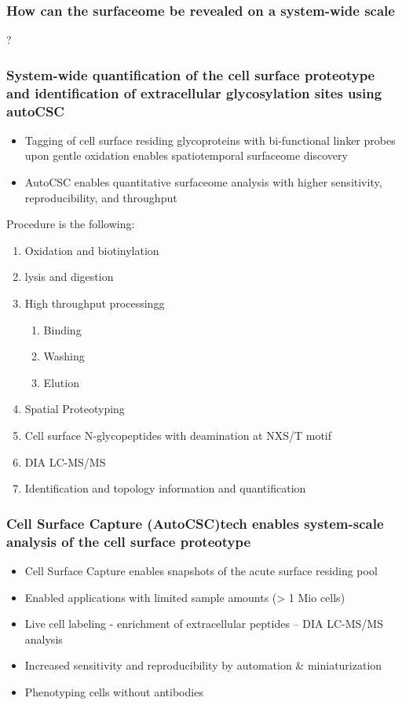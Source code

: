 \begin{itemize}
\begin{itemize}
\subsubsection{How can the surfaceome be revealed on a system-wide scale}?
\subsubsection{System-wide quantification of the cell surface proteotype and identification of extracellular glycosylation sites using autoCSC}
\begin{itemize}
    \item Tagging of cell surface residing glycoproteins with bi-functional linker probes upon gentle oxidation enables spatiotemporal surfaceome discovery
    \item AutoCSC enables quantitative surfaceome analysis with higher sensitivity, reproducibility, and throughput
\end{itemize}
Procedure is the following:
\begin{enumerate}
    \item Oxidation and biotinylation
    \item lysis and digestion
    \item High throughput processingg
    \begin{enumerate}
        \item Binding
        \item Washing
        \item Elution
    \end{enumerate}
    \item Spatial Proteotyping
    \item Cell surface N-glycopeptides with deamination at NXS/T motif
    \item DIA LC-MS/MS
    \item Identification and topology information and quantification
\end{enumerate}

\subsubsection{Cell Surface Capture (AutoCSC)tech enables system-scale analysis of the cell surface proteotype}
\begin{itemize}
    \item Cell Surface Capture enables snapshots of the
acute surface residing pool
\item Enabled applications with limited sample
amounts (> 1 Mio cells)
\item Live cell labeling - enrichment of extracellular
peptides – DIA LC-MS/MS analysis
\item Increased sensitivity and reproducibility by
automation & miniaturization
\item Phenotyping cells without antibodies
\end{itemize}

\end{itemize}
\end{itemize}
